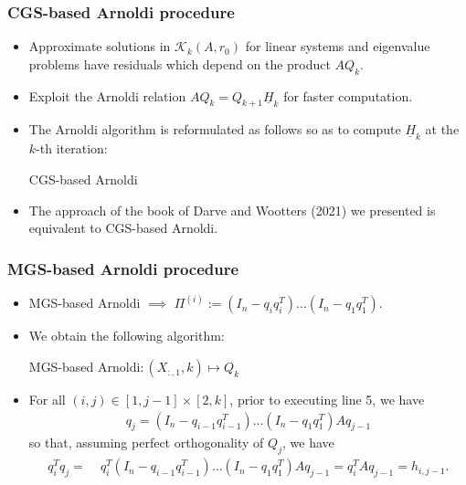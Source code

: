 \documentclass[t,usepdftitle=false]{beamer}
\begin{document}
\begin{frame}
\frametitle{CGS-based Arnoldi procedure}	
\begin{itemize}
\item Approximate solutions in $\mathcal{K}_k(A,r_0)$ for linear systems and eigenvalue problems have residuals which depend on the product $AQ_k$.
\item Exploit the Arnoldi relation $AQ_k=Q_{k+1}\underline{H}_k$ for faster computation.
\item The Arnoldi algorithm is reformulated as follows so as to compute $\underline{H}_k$ at the $k$-th iteration:
\begin{algorithm}[H]
\small
\caption{CGS-based Arnoldi}%
\begin{algorithmic}[1]
\ENDFOR
\end{algorithmic}
\end{algorithm}		
\item The approach of the book of Darve and Wootters (2021) we presented is equivalent to CGS-based Arnoldi.		
\end{itemize}
\end{frame}   

\begin{frame}
\frametitle{MGS-based Arnoldi procedure}	
\begin{itemize}
\item MGS-based Arnoldi $\implies$ $\Pi^{(i)}:=(I_n-q_{i}q_{i}^T)\dots(I_n-q_{1}q_{1}^T)$.
\item We obtain the following algorithm:
\begin{algorithm}[H]
\small
\caption{MGS-based Arnoldi$:(X_{:,1},k)\mapsto Q_k$}
\begin{algorithmic}[1]
\ENDFOR
{}
\ENDFOR
\end{algorithmic}
\end{algorithm}		
\item For all $(i,j)\in[1,j-1]\times[2,k]$, prior to executing line 5, we have
\begin{align*}
q_{j}=(I_n-q_{i-1}q_{i-1}^T)\dots(I_n-q_{1}q_{1}^T)Aq_{j-1}
\end{align*}
so that, assuming perfect orthogonality of $Q_j$, we have
\begin{align*}
q_{i}^Tq_{j}=&\;q_{i}^T(I_n-q_{i-1}q_{i-1}^T)\dots(I_n-q_{1}q_{1}^T)Aq_{j-1}=q_{i}^TAq_{j-1}=h_{i,j-1}.
\end{align*}
\end{itemize}
\end{frame}   
\end{document}
